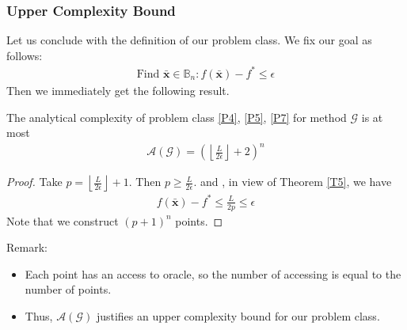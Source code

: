 \subsubsection{Upper Complexity Bound}
Let us conclude with the definition of our problem class. We fix our goal as follows:
\begin{align}
    \text{Find }\bar{\bm x}\in \mathbb{B}_n:f(\bar{\bm x})-f^*\le \epsilon \label{P7}
\end{align}
Then we immediately get the following result.

\begin{corollary}
    The analytical complexity of problem class \ref{P4}, \ref{P5}, \ref{P7} for method $\mathcal{G}$ is at most
    \begin{align*}
        \mathcal{A}(\mathcal{G})=\left( \left\lfloor \frac{L}{2\epsilon} \right\rfloor +2 \right)^n
    \end{align*}
\end{corollary}

\begin{proof}
    Take $p=\left\lfloor \frac{L}{2\epsilon} \right\rfloor+1$. Then $p\ge \frac{L}{2\epsilon}$. and , in view of Theorem \ref{T5}, we have
    \begin{align*}
        f(\bar{\bm x})-f^*\le \frac{L}{2p}\le \epsilon
    \end{align*}
    Note that we construct $(p + 1)^n$ points.
\end{proof}

Remark:
\begin{itemize}
    \item Each point has an access to oracle, so the number of accessing is equal to the number of points.
    \item Thus, $\mathcal{A}(\mathcal{G})$ justifies an upper complexity bound for our problem class.
\end{itemize}

